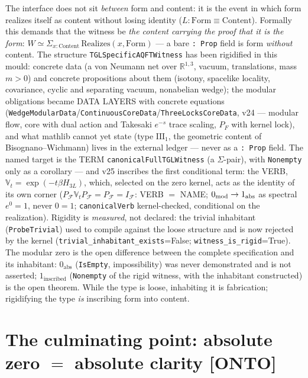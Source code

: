 \documentclass[11pt]{article}
\providecommand{\kernelmk}[1]{\textsf{[KERNEL]}~\texttt{#1}}\providecommand{\knownmk}[1]{\textsf{[KNOWN]}~{#1}}\providecommand{\statusmk}[1]{\textsf{[#1]}}
\theoremstyle{definition}\newtheorem{deriv}{Derivation}
\begin{document}
The interface does not sit \emph{between} form and content: it is the event in which form realizes itself as content without losing identity ($L:\mathrm{Form}\equiv\mathrm{Content}$). Formally this demands that the witness be \emph{the content carrying the proof that it is the form}: $W\simeq\Sigma_{x:\mathrm{Content}}\,\mathrm{Realizes}(x,\mathrm{Form})$ --- a bare \texttt{: Prop} field is form \emph{without} content. The structure \texttt{TGLSpecificAQFTWitness} has been rigidified in this mould: concrete data (a von Neumann net over $\mathbb R^{1,3}$, vacuum, translations, mass $m>0$) and concrete propositions about them (isotony, spacelike locality, covariance, cyclic and separating vacuum, nonabelian wedge); the modular obligations became DATA LAYERS with concrete equations (\texttt{WedgeModularData}/\texttt{ContinuousCoreData}/\texttt{ThreeLocksCoreData}, v24 --- modular flow, core with dual action and Takesaki $e^{-s}$ trace scaling, $P_F$ with kernel lock), and what mathlib cannot yet state (type $\mathrm{III}_1$, the geometric content of Bisognano--Wichmann) lives in the external ledger --- never as a \texttt{: Prop} field. The named target is the TERM \texttt{canonicalFullTGLWitness} (a $\Sigma$-pair), with \texttt{Nonempty} only as a corollary --- and v25 inscribes the first conditional term: the VERB, $\mathbb V_t=\exp(-t\beta H_{3L})$, which, selected on the zero kernel, acts as the identity of its own corner ($P_{\mathcal F}\mathbb V_tP_{\mathcal F}=P_{\mathcal F}=I_{\mathcal F}$: VERB $=$ NAME; $0_{\rm mod}\to1_{\rm abs}$ as spectral $e^0=1$, never $0=1$; \texttt{canonicalVerb} kernel-checked, conditional on the realization). Rigidity is \emph{measured}, not declared: the trivial inhabitant (\texttt{ProbeTrivial}) used to compile against the loose structure and is now rejected by the kernel (\texttt{trivial\_inhabitant\_exists}=False; \texttt{witness\_is\_rigid}=True). The modular zero is the open difference between the complete specification and its inhabitant: $0_{\mathrm{abs}}$ (\texttt{IsEmpty}, impossibility) was never demonstrated and is not asserted; $1_{\mathrm{inscribed}}$ (\texttt{Nonempty} of the rigid witness, with the inhabitant constructed) is the open theorem. While the type is loose, inhabiting it is fabrication; rigidifying the type \emph{is} inscribing form into content.

\clearpage\providecommand{\kernelmk}[1]{\textsf{[KERNEL]}~\texttt{#1}}\providecommand{\knownmk}[1]{\textsf{[KNOWN]}~{#1}}\providecommand{\statusmk}[1]{\textsf{[#1]}}

\section*{The culminating point: absolute zero $=$ absolute clarity \textsf{[ONTO]}}
\end{document}
